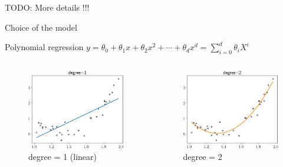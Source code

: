 \documentclass[handout]{beamer}
\begin{document}
TODO: More details !!!
\begin{frame}{Choice of the model}
\begin{block}{Polynomial regression}
$y=\theta_0 + \theta_1 x + \theta_2 x^2 + \cdots + \theta_d x^d = \sum_{i=0}^d \theta_i X^i$
\end{block}
\begin{columns}
\pause
    \begin{figure}
    \caption*{degree = 1 (linear)}
    \includegraphics[width=\textwidth]{fig/L1/interp-pol-1.png}
    \end{figure}
\pause
    \begin{figure}
    \caption*{degree = 2 }
    \includegraphics[width=\textwidth]{fig/L1/interp-pol-2.png}

\end{figure}
\end{columns}
\end{frame}
\end{document}
